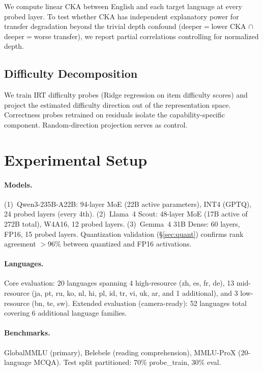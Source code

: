 \documentclass[11pt,a4paper]{article}
\begin{document}
We compute linear CKA \cite{kornblith2019similarity} between English and each target language at every probed layer.
To test whether CKA has independent explanatory power for transfer degradation beyond the trivial depth confound (deeper$=$lower CKA $\cap$ deeper$=$worse transfer), we report partial correlations controlling for normalized depth.

\subsection{Difficulty Decomposition}
\label{sec:decomp}

We train IRT difficulty probes (Ridge regression on item difficulty scores) and project the estimated difficulty direction out of the representation space.
Correctness probes retrained on residuals isolate the capability-specific component.
Random-direction projection serves as control.

\section{Experimental Setup}
\label{sec:setup}

\paragraph{Models.}
(1)~Qwen3-235B-A22B: 94-layer MoE (22B active parameters), INT4 (GPTQ), 24 probed layers (every 4th).
(2)~Llama~4 Scout: 48-layer MoE (17B active of 272B total), W4A16, 12 probed layers.
(3)~Gemma~4 31B Dense: 60 layers, FP16, 15 probed layers.
Quantization validation (\S\ref{sec:quant}) confirms rank agreement ${>}96\%$ between quantized and FP16 activations.

\paragraph{Languages.}
Core evaluation: 20 languages spanning 4 high-resource (zh, es, fr, de), 13 mid-resource (ja, pt, ru, ko, nl, hi, pl, id, tr, vi, uk, ar, and 1 additional), and 3 low-resource (bn, te, sw).
Extended evaluation (camera-ready): 52 languages total covering 6 additional language families.

\paragraph{Benchmarks.}
GlobalMMLU (primary), Belebele (reading comprehension), MMLU-ProX (20-language MCQA).
Test split partitioned: 70\% probe\_train, 30\% eval.
\end{document}
